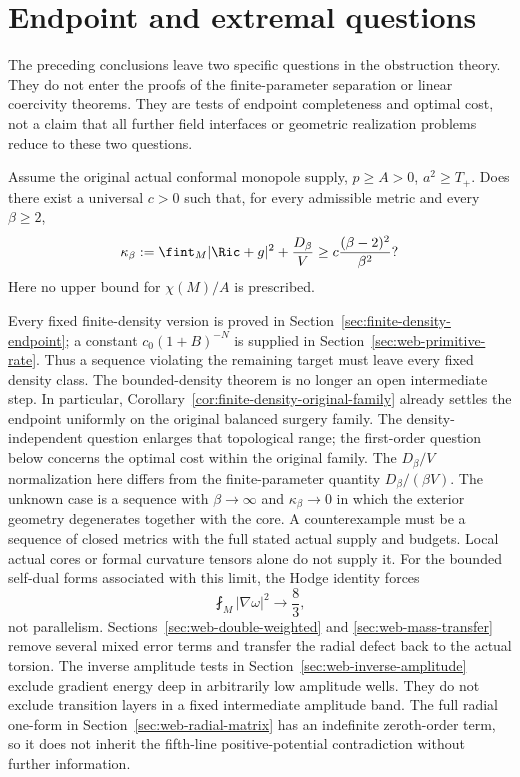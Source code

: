 \section{Endpoint and extremal questions}
\label{sec:open-problems}
The preceding conclusions leave two specific questions in the obstruction
theory. They do not enter the proofs of the finite-parameter separation or
linear coercivity theorems. They are tests of endpoint completeness and
optimal cost, not a claim that all further field interfaces or geometric
realization problems reduce to these two questions.

\begin{problem}
Assume the original actual conformal monopole supply, $p\ge A>0$,
$a^2\ge T_+$. Does there exist a universal $c>0$ such that, for every
admissible metric and every $\beta\ge2$,
\[
 \kappa_\beta:=\fint_M|\Ric+g|^2+\frac{D_\beta}{V}
 \ge c\frac{(\beta-2)^2}{\beta^2}?
\]
Here no upper bound for $\chi(M)/A$ is prescribed.
\end{problem}
Every fixed finite-density version is proved in
Section~\ref{sec:finite-density-endpoint}; a constant
$c_0(1+B)^{-N}$ is supplied in Section~\ref{sec:web-primitive-rate}.
Thus a sequence violating the remaining target must leave every fixed
density class. The bounded-density theorem is no longer an open
intermediate step.
In particular, Corollary~\ref{cor:finite-density-original-family}
already settles the endpoint uniformly on the original balanced
surgery family. The density-independent question enlarges that
topological range; the first-order question below concerns the
optimal cost within the original family.
The $D_\beta/V$ normalization here differs from the finite-parameter
quantity $D_\beta/(\beta V)$. The unknown case is a sequence with
$\beta\to\infty$ and $\kappa_\beta\to0$ in which the exterior geometry
degenerates together with the core. A counterexample must be a sequence
of closed metrics with the full stated actual supply and budgets.
Local actual cores or formal curvature tensors alone do not supply it.
For the bounded self-dual forms associated with this limit, the Hodge
identity forces
\[
 \fint_M|\nabla\omega|^2\longrightarrow\frac83,
\]
not parallelism. Sections~\ref{sec:web-double-weighted} and
\ref{sec:web-mass-transfer} remove several mixed error terms and
transfer the radial defect back to the actual torsion. The inverse
amplitude tests in Section~\ref{sec:web-inverse-amplitude} exclude
gradient energy deep in arbitrarily low amplitude wells. They do not
exclude transition layers in a fixed intermediate amplitude band.
The full radial one-form in Section~\ref{sec:web-radial-matrix}
has an indefinite zeroth-order term, so it does not inherit the
fifth-line positive-potential contradiction without further information.

